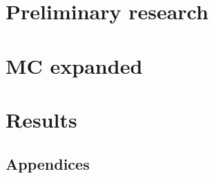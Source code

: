\part{Preliminary research}
\begin{multicols}{3}

   


\end{multicols}
\part{MC expanded}\label{part:mcexpanded}
\begin{multicols}{3}

   

   
   


   



\end{multicols}
\part{Results}
\begin{multicols}{3}

   

   
   

\end{multicols}
\begin{appendices}
   \part{Appendices}

   
\end{appendices}


